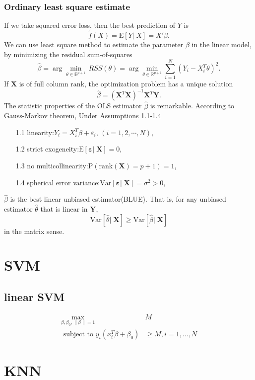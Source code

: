 \documentclass{report}
\theoremstyle{nonumberplain}
\newcommand{\E}{\mathrm{E}}
\newcommand{\Var}{\mathrm{Var}}
\newcommand{\Y}{\mathbf{Y}}
\newcommand{\X}{\mathbf{X}}
\newcommand{\0}{\mathbf{0}}
\newcommand{\vep}{\bm{\varepsilon}}
\begin{document}
\subsection{Ordinary least square estimate}
If we take squared error loss, then the best prediction of $Y$ is
\[
\tilde{f}(X) = \mathrm{E}[Y|\; X]=X'\beta.
\]
We can use least square method to estimate the parameter $\beta$ in the linear model, by minimizing the residual sum-of-squares
\[
\hat{\beta}=\arg\min_{\theta\in\mathbb{R}^{p+1}}\, RSS(\theta)=\arg\min_{\theta\in\mathbb{R}^{p+1}}\sum_{i=1}^N(Y_i-X_i^T\theta)^2.
\]
If $\X$ is of full column rank, the optimization problem has a unique solution
\[
\hat{\beta}=(\X^T\X)^{-1}\X^T\Y.
\]
The statistic properties of the OLS estimator $\hat{\beta}$ is remarkable. According to Gauss-Markov theorem, Under Assumptions 1.1-1.4
\begin{enumerate}
	\item[1.1]linearity:\quad $Y_i= X_i^T\beta+\varepsilon_i$, $(i=1,2,\cdots,N)$,
	\item[1.2] strict exogeneity:\quad $\E[\vep|\;\X]=0$,
	\item[1.3] no multicollinearity:\quad  $\mathrm{P}(\mathrm{rank}(\X)=p+1)=1$,
	\item[1.4] spherical error variance:\quad $\Var[\vep|\;\X]=\sigma^2>0$,
\end{enumerate}
$\hat{\beta}$ is the best linear unbiased estimator(BLUE). That is, for any unbiased estimator $\hat{\theta}$ that is linear in $\Y$, 
\[
\Var[\hat{\theta}|\;\X]\ge\Var[\hat{\beta}|\;\X]
\]
in the matrix sense. 

\chapter{SVM}

\section{linear SVM}

\begin{align*}
	\max _{\beta, \beta_{0},\|\beta\|=1} &M\\
	\text { subject to } y_{i}\left(x_{i}^{T} \beta+\beta_{0}\right)& \geq M, i=1, \ldots, N
\end{align*}




\chapter{KNN}
\end{document}

